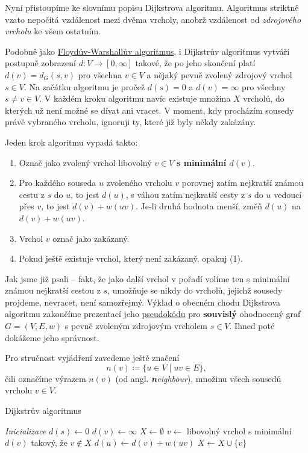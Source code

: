 Nyní přistoupíme ke slovnímu popisu Dijkstrova algoritmu. Algoritmus striktně
vzato nepočítá vzdálenost mezi dvěma vrcholy, anobrž vzdálenost od
\emph{zdrojového vrcholu} ke všem ostatním.

Podobně jako \hyperref[alg:floyd-warshall]{Floydův-Warshallův algoritmus}, i
Dijkstrův algoritmus vytváří postupně zobrazení $d:V \to [0,\infty]$ takové, že
po jeho skončení platí $d(v) = d_G(s,v)$ pro všechna $v \in V$ a nějaký pevně
zvolený zdrojový vrchol $s \in V$. Na začátku algoritmu je pročež $d(s) = 0$ a
$d(v) = \infty$ pro všechny $s \neq v \in V$. V každém kroku algoritmu navíc
existuje množina $X$  vrcholů, do kterých už není možné se dívat
ani vracet. V moment, kdy procházím sousedy právě vybraného vrcholu, ignoruji
ty, které již byly někdy zakázány.

Jeden krok algoritmu vypadá takto:
\begin{enumerate}
 \item Označ jako zvolený vrchol libovolný $v \in V$ \textbf{s minimální
  $d(v)$}.
 \item Pro každého souseda $u$ zvoleného vrcholu $v$ porovnej zatím nejkratší
  známou cestu z $s$ do $u$, to jest $d(u)$, s váhou zatím nejkratší cesty z $s$
  do $u$ vedoucí přes $v$, to jest $d(v) + w(uv)$. Je-li druhá hodnota menší,
  změň $d(u)$ na $d(v) + w(uv)$.
 \item Vrchol $v$ označ jako zakázaný.
 \item Pokud ještě existuje vrchol, který není zakázaný, opakuj (1).
\end{enumerate}

Jak jsme již psali -- fakt, že jako další vrchol v pořadí volíme ten s minimální
známou nejkratší cestou z $s$, umožňuje se nikdy do vrcholů, jejichž sousedy
projdeme, nevracet, není samozřejmý. Výklad o obecném chodu Dijkstrova algoritmu
zakončíme prezentací jeho \hyperref[alg:dijkstra]{pseudokódu} pro
\textbf{souvislý} ohodnocený graf $G = (V,E,w)$ s pevně zvoleným zdrojovým
vrcholem $s \in V$. Ihned poté dokážeme jeho správnost.

Pro stručnost vyjádření zavedeme ještě značení
\[
 n(v) \coloneqq \{u \in V \mid uv \in E\},
\]
čili označíme výrazem $n(v)$ (od angl. \emph{\textbf{n}eighbour}), množinu všech
sousedů vrcholu $v \in V$.

\begin{algorithm}
 \caption{Dijkstrův algoritmus}
 \label{alg:dijkstra}


 \BlankLine
 \emph{Inicializace}\;
 $d(s) \leftarrow 0$\;
  {
  $d(v) \leftarrow \infty$\;
 }
 $X \leftarrow \emptyset$\;
 \BlankLine
  {
  $v \leftarrow $ libovolný vrchol s minimální $d(v)$ takový, že $v \notin X$\;
   {
    {
    $d(u) \leftarrow d(v) + w(uv)$\;
   }
  }
  $X \leftarrow X \cup \{v\}$\;
 }
 \;
\end{algorithm}

